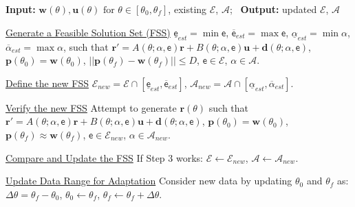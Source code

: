 \begin{algorithm}
    \begin{algorithmic}[1]
        \small
        \Statex \textbf{Input:} $\boldsymbol{w}(\theta), \boldsymbol{u}(\theta) \text{ for } \theta\in[\theta_0,\theta_f]$, existing ${\mathcal{E}}$, ${\mathcal{A}}$; \, \textbf{Output:} updated ${\mathcal{E}}$, ${\mathcal{A}}$
        
        \State \underline{Generate a Feasible Solution Set (FSS)}
        \Statex \indent $\underline{{\mathsf{e}}}_{est} = \min{\mathsf{e}}$,
        \Statex \indent $\overline {{\mathsf{e}}}_{est} = \max{\mathsf{e}}$,
        \Statex \indent $\underline{ \alpha     }_{est} = \min{\alpha}$,
        \Statex \indent $\overline { \alpha     }_{est} = \max{\alpha}$, such that 
        \Statex \indent \indent $\boldsymbol{r}'=A(\theta; \alpha, \mathsf{e})\boldsymbol{r}+B(\theta; \alpha, \mathsf{e})\boldsymbol{u}+\boldsymbol{d}(\theta; \alpha, \mathsf{e})$,
        \Statex \indent \indent $\boldsymbol{p}(\theta_0)=\boldsymbol{w}(\theta_0)$, $||\boldsymbol{p}(\theta_f)-\boldsymbol{w}(\theta_f)||\leq D$,
        \Statex \indent \indent ${\mathsf{e}}\in{\mathcal{E}}$, $\alpha  \in{\mathcal{A}}$.
        
        \State \underline{Define the new FSS}
        \Statex \indent ${\mathcal{E}}_{new}={\mathcal{E}}\cap[\underline{{\mathsf{e}}}_{est}, \overline{{\mathsf{e}}}_{est}]$,
        \Statex \indent ${\mathcal{A}}_{new}={\mathcal{A}}\cap[\underline{\alpha}_{est},   \overline{\alpha}_{est}]$.
    
        \State \underline{Verify the new FSS}
        \Statex \indent Attempt to generate $\boldsymbol{r}(\theta)$ such that
        \Statex \indent \indent $\boldsymbol{r}'=A(\theta; \alpha, \mathsf{e})\boldsymbol{r}+B(\theta; \alpha, \mathsf{e})\boldsymbol{u}+\boldsymbol{d}(\theta; \alpha, \mathsf{e})$,
        \Statex \indent \indent $\boldsymbol{p}(\theta_0)=\boldsymbol{w}(\theta_0)$, $\boldsymbol{p}(\theta_f)\approx \boldsymbol{w}(\theta_f)$,
        \Statex \indent \indent ${\mathsf{e}}\in{\mathcal{E}}_{new}$, $\alpha  \in{\mathcal{A}}_{new}$.
    
        \State \underline{Compare and Update the FSS}
        \Statex \indent If Step 3 works:
        \Statex \indent \indent ${\mathcal{E}}\leftarrow{\mathcal{E}}_{new}$,
        \Statex \indent \indent ${\mathcal{A}}\leftarrow{\mathcal{A}}_{new}$.
        
        \State \underline{Update Data Range for Adaptation}
        \Statex \indent Consider new data by updating $\theta_0$ and $\theta_f$ as:
        \Statex \indent \indent $\Delta\theta = \theta_f - \theta_0$,
        \Statex \indent \indent $\theta_0 \leftarrow \theta_f$,
        \Statex \indent \indent $\theta_f \leftarrow \theta_f + \Delta \theta$.
    \end{algorithmic}
    \caption{A single iteration of \textbf{set membership identification (SMID)}}
    \label{alg:smid}
\end{algorithm}
